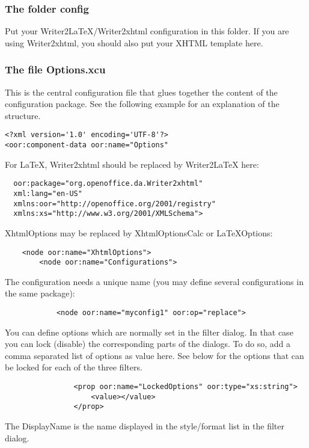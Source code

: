 \documentclass{article}
\begin{document}
\subsubsection{The folder config}
{\mdseries
Put your Writer2LaTeX/Writer2xhtml configuration in this folder. If you are using Writer2xhtml, you should also put your XHTML template here.}

\subsubsection{The file Options.xcu}
{\mdseries
This is the central configuration file that glues together the content of the configuration package. See the following example for an explanation of the structure.}

\begin{verbatim}
<?xml version='1.0' encoding='UTF-8'?>
<oor:component-data oor:name="Options"
\end{verbatim}
{\mdseries
For LaTeX, Writer2xhtml should be replaced by Writer2LaTeX here:}

\begin{verbatim}
  oor:package="org.openoffice.da.Writer2xhtml"
  xml:lang="en-US"
  xmlns:oor="http://openoffice.org/2001/registry"
  xmlns:xs="http://www.w3.org/2001/XMLSchema">
\end{verbatim}
{\mdseries
XhtmlOptions may be replaced by XhtmlOptionsCalc or LaTeXOptions:}

\begin{verbatim}
    <node oor:name="XhtmlOptions">
        <node oor:name="Configurations">
\end{verbatim}
{\mdseries
The configuration needs a unique name (you may define several configurations in the same package):}

\begin{verbatim}
            <node oor:name="myconfig1" oor:op="replace">
\end{verbatim}
{\mdseries
You can define options which are normally set in the filter dialog. In that case you can lock (disable) the corresponding parts of the dialogs. To do so, add a comma separated list of options as value here. See below for the options that can be locked for each of the three filters.}

\begin{verbatim}
                <prop oor:name="LockedOptions" oor:type="xs:string">
                    <value></value>
                </prop>
\end{verbatim}
{\mdseries
The DisplayName is the name displayed in the style/format list in the filter dialog.}
\end{document}
